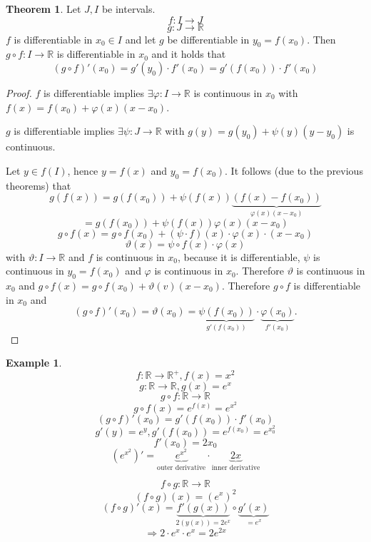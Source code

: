 \documentclass[a4paper,landscape,twocolumn]{article}
\theoremstyle{definition}
\newtheorem{theorem}{Theorem}
\newtheorem{ex}{Example}
\begin{document}
\begin{theorem}
  Let $J, I$ be intervals.
  \[ f: I \to J \]
  \[ g: J \to \mathbb R \]
  $f$ is differentiable in $x_0 \in I$ and let $g$ be differentiable in $y_0 = f(x_0)$.
  Then $g \circ f: I \to \mathbb R$ is differentiable in $x_0$ and it holds that
  \[ (g \circ f)'(x_0) = g'(y_0) \cdot f'(x_0) = g'(f(x_0)) \cdot f'(x_0) \]
\end{theorem}
\begin{proof}
  $f$ is differentiable implies $\exists \varphi: I \to \mathbb R$ is continuous
  in $x_0$ with $f(x) = f(x_0) + \varphi(x)(x - x_0)$.

  $g$ is differentiable implies $\exists \psi: J \to \mathbb R$ with $g(y) = g(y_0) + \psi(y)(y - y_0)$
  is continuous.

  Let $y \in f(I)$, hence $y = f(x)$ and $y_0 = f(x_0)$.
  It follows (due to the previous theorems) that
  \[ g(f(x)) = g(f(x_0)) + \psi(f(x))\underbrace{\left(f(x) - f(x_0)\right)}_{\varphi(x)(x - x_0)} \]
  \[ = g(f(x_0)) + \psi(f(x)) \varphi(x) (x - x_0) \]
  \[ g \circ f(x) = g \circ f(x_0) + (\psi \cdot f)(x) \cdot \varphi (x) \cdot (x - x_0) \]
  \[ \vartheta(x) = \psi \circ f(x) \cdot \varphi(x) \]
  with $\vartheta: I \to \mathbb R$ and $f$ is continuous in $x_0$, because
  it is differentiable, $\psi$ is continuous in $y_0 = f(x_0)$ and $\varphi$ is continuous in $x_0$.
  Therefore $\vartheta$ is continuous in $x_0$ and
  $g \circ f(x) = g \circ f(x_0) + \vartheta (v) (x - x_0)$.
  Therefore $g \circ f$ is differentiable in $x_0$
  and
  \[
    (g \circ f)'(x_0)
    = \vartheta(x_0)
    = \underbrace{\psi(f(x_0))}_{g'(f(x_0))} \cdot \underbrace{\varphi(x_0)}_{f'(x_0)}.
  \]
\end{proof}
%
\begin{ex}
  \[ f: \mathbb R \to \mathbb R^+, f(x) = x^2 \]
  \[ g: \mathbb R \to \mathbb R, g(x) = e^x \]
  \[ g \circ f: \mathbb R \to \mathbb R \]
  \[ g \circ f(x) = e^{f(x)} = e^{x^2} \]
  \[ (g \circ f)'(x_0) = g'(f(x_0)) \cdot f'(x_0) \]
  \[ g'(y) = e^y, g'(f(x_0)) = e^{f(x_0)} = e^{x_0^2} \]
  \[ f'(x_0) = 2x_0 \]
  \[
    (e^{x^2})' = \underbrace{e^{x^2}}_{\text{outer derivative}} \cdot
    \underbrace{2x}_{\text{inner derivative}}
  \]

  \[ f \circ g: \mathbb R \to \mathbb R \]
  \[ (f \circ g)(x) = (e^x)^2 \]
  \[ (f \circ g)'(x) = \underbrace{f'(g(x))}_{2(y(x)) = 2e^x} \circ \underbrace{g'(x)}_{=e^x} \]
  \[ \Rightarrow 2 \cdot e^x \cdot e^x = 2e^{2x} \]
\end{ex}
\end{document}
